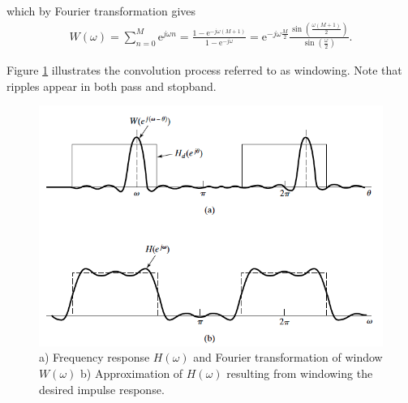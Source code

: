 which by Fourier transformation gives 
\begin{align}
W \left(\omega\right)=\sum_{n=0}^{M} \text{e}^{j\omega n} = \frac{1- \text{e}^{-j\omega(M+1)}}{1- \text{e}^{-j\omega}} = \text{e}^{-j\omega \frac{M}{2}} \frac{ \sin \left( \frac{\omega \left( M+1 \right)}{2} \right)}{\sin \left( \frac{\omega}{2} \right)}.
\end{align}

Figure \ref{fig:FIR1} illustrates the convolution process referred to as windowing. Note that ripples appear in both pass and stopband.

\begin{figure}[H]
    \centering
    \includegraphics[scale=0.4]{figures/FIR1.png}
    \caption{a) Frequency response $H(\omega)$ and Fourier transformation of window $W(\omega)$ b) Approximation of $H(\omega)$ resulting from windowing the desired impulse response.}
    \label{fig:FIR1}
\end{figure}


